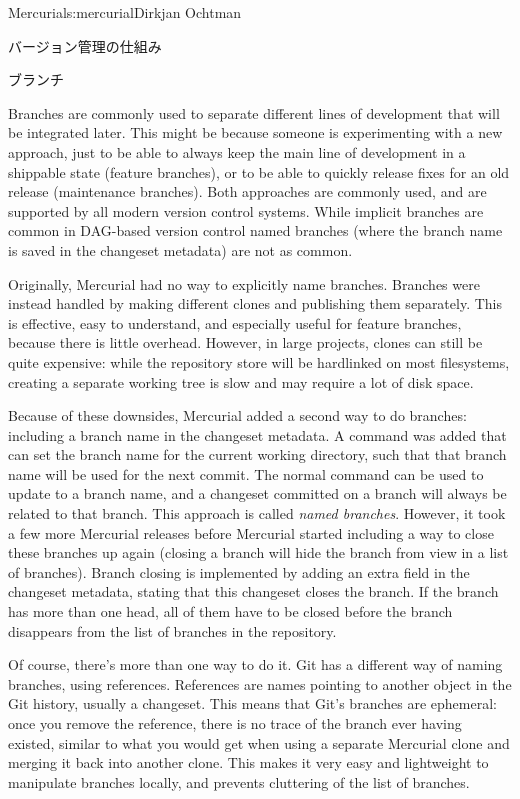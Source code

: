 \begin{aosachapter}{Mercurial}{s:mercurial}{Dirkjan Ochtman}
\begin{aosasect1}{バージョン管理の仕組み}
\begin{aosasect2}{ブランチ}

Branches are commonly used to separate different lines of development
that will be integrated later. This might be because someone is
experimenting with a new approach, just to be able to always keep the
main line of development in a shippable state (feature branches), or
to be able to quickly release fixes for an old release (maintenance
branches). Both approaches are commonly used, and are supported by all
modern version control systems. While implicit branches are common in
DAG-based version control named branches (where the branch name is
saved in the changeset metadata) are not as common.

Originally, Mercurial had no way to explicitly name branches. Branches
were instead handled by making different clones and publishing them
separately. This is effective, easy to understand, and especially
useful for feature branches, because there is little
overhead. However, in large projects, clones can still be quite
expensive: while the repository store will be hardlinked on most
filesystems, creating a separate working tree is slow and may require
a lot of disk space.

Because of these downsides, Mercurial added a second way to do
branches: including a branch name in the changeset metadata. A
 command was added that can set the branch name for the
current working directory, such that that branch name will be used for
the next commit. The normal  command can be used to
update to a branch name, and a changeset committed on a branch will
always be related to that branch. This approach is called \emph{named
branches}. However, it took a few more Mercurial releases before
Mercurial started including a way to close these branches up
again (closing a branch will hide the branch from view in a list of
branches). Branch closing is implemented by adding an extra field in the changeset
metadata, stating that this changeset closes the branch. If the branch
has more than one head, all of them have to be closed before the
branch disappears from the list of branches in the repository.

Of course, there's more than one way to do it.
Git has a different way of naming branches, using
references. References are names pointing to another object in the
Git history, usually a changeset. This means that Git's branches are
ephemeral: once you remove the reference, there is no trace of the
branch ever having existed, similar to what you would get when using a
separate Mercurial clone and merging it back into another clone. This
makes it very easy and lightweight to manipulate branches locally, and
prevents cluttering of the list of branches.


\end{aosasect2}
\end{aosasect1}
\end{aosachapter}
